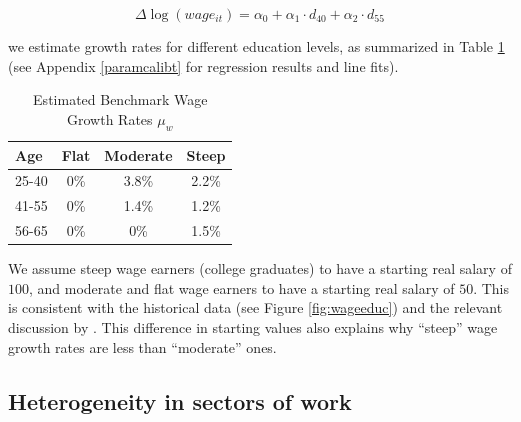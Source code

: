 \begin{equation}
	\Delta \log (wage_{it}) = \alpha_0 + \alpha_1 \cdot d_{40} + \alpha_2 \cdot d_{55}
\end{equation}

we estimate growth rates for different education levels, as summarized in Table \ref{table:dincome} (see Appendix \ref{paramcalibt} for regression results and line fits). 

\begin{table}[h!]
	\centering
	\caption{Estimated Benchmark Wage Growth Rates $\mu_w$}
	\label{table:dincome}
	\begin{tabular}[c]{l|ccc}
		Age&Flat&Moderate&Steep\\
		\hline
		25-40&0\%&3.8\%&2.2\%\\
		41-55&0\%&1.4\%&1.2\%\\
		56-65&0\%&0\%&1.5\%\\
	\end{tabular}
\end{table}

We assume steep wage earners (college graduates) to have a starting real salary of $100$, and moderate and flat wage earners to have a starting real salary of $50$. This is consistent with the historical data (see Figure \ref{fig:wageeduc}) and the relevant discussion by \citet{olear}. This difference in starting values also explains why ``steep'' wage growth rates are less than ``moderate'' ones.  

\subsection{Heterogeneity in sectors of work}

